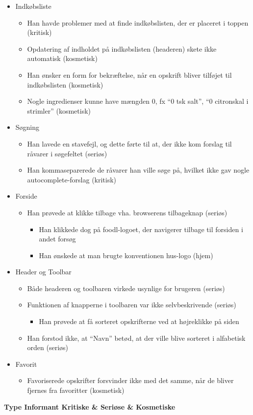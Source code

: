  \begin{itemize}[noitemsep]
 \item Indkøbsliste
  \begin{itemize}[noitemsep]
  \item Han havde problemer med at finde indkøbslisten, der er placeret i toppen (kritisk)
  \item Opdatering af indholdet på indkøbslisten (headeren) skete ikke automatisk (kosmetisk)
  \item Han ønsker en form for bekræftelse, når en opskrift bliver tilføjet til indkøbslisten (kosmetisk)
  \item Nogle ingredienser kunne have mængden 0, fx “0 tsk salt”, “0 citronskal i strimler” (kosmetisk)
  \end{itemize}
 \item Søgning
  \begin{itemize}[noitemsep]
  \item Han lavede en stavefejl, og dette førte til at, der ikke kom forslag til råvarer i søgefeltet (seriøs)
  \item Han kommaseparerede de råvarer han ville søge på, hvilket ikke gav nogle autocomplete-forslag (kritisk)
  \end{itemize}
 \item Forside
  \begin{itemize}[noitemsep]
  \item Han prøvede at klikke tilbage vha. browserens tilbageknap (seriøs)
   \begin{itemize}[noitemsep]
   \item Han klikkede dog på foodl-logoet, der navigerer tilbage til forsiden i andet forsøg 
   \item Han ønskede at man brugte konventionen hus-logo (hjem)
   \end{itemize}
  \end{itemize}
 \item Header og Toolbar
  \begin{itemize}[noitemsep]
  \item Både headeren og toolbaren virkede usynlige for brugeren (seriøs)
  \item Funktionen af knapperne i toolbaren var ikke selvbeskrivende (seriøs)
   \begin{itemize}[noitemsep]
   \item Han prøvede at få sorteret opskrifterne ved at højreklikke på siden
   \end{itemize}
  \item Han forstod ikke, at “Navn” betød, at der ville blive sorteret i alfabetisk orden (seriøs)
  \end{itemize}
 \item Favorit
  \begin{itemize}[noitemsep]
  \item Favoriserede opskrifter forsvinder ikke med det samme, når de bliver fjernes fra favoritter (kosmetisk)
  \end{itemize}
\end{itemize}


\textbf{
           						 {Type}
       {Informant             	}{Kritiske   & Seriøse   & Kosmetiske}{
}
}